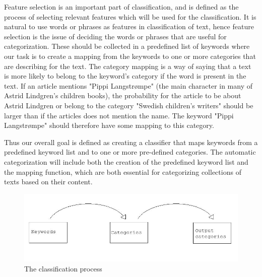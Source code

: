 \documentclass[english,a4paper]{ifimaster}
\begin{document}
Feature selection is an important part of classification, and is defined as the process of selecting relevant features which will be used for the classification. It is natural to use words or phrases as features in classification of text, hence feature selection is the issue of deciding the words or phrases that are useful for categorization. These should be collected in a predefined list of keywords where our task is to create a mapping from the keywords to one or more categories that are describing for the text. The category mapping is a way of saying that a text is more likely to belong to the keyword's category if the word is present in the text. If an article mentions "Pippi Langstrømpe" (the main character in many of Astrid Lindgren's children books), the probability for the article to be about Astrid Lindgren or belong to the category "Swedish children's writers" should be larger than if the articles does not mention the name. The keyword "Pippi Langstrømpe" should therefore have some mapping to this category. 

Thus our overall goal is defined as creating a classifier that maps keywords from a predefined keyword list and to one or more pre-defined categories. The automatic categorization will include both the creation of the predefined keyword list and the mapping function, which are both essential for categorizing collections of texts based on their content. 

\begin{figure}[H]
\centering
\includegraphics[width=1\textwidth]{classification_process.jpeg}
\caption{The classification process}
\label{fig:classification_process}
\end{figure}
\end{document}
